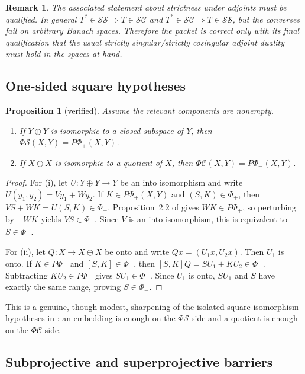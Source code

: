 \documentclass[11pt]{article}
\newtheorem{proposition}[theorem]{Proposition}
\newtheorem{remark}[theorem]{Remark}
\theoremstyle{definition}
\newcommand{\SSing}{\mathcal{SS}}
\newcommand{\SCos}{\mathcal{SC}}
\newcommand{\PhiS}{\Phi\mathcal S}
\newcommand{\PhiC}{\Phi\mathcal C}
\newcommand{\PhiP}{\Phi_+}
\newcommand{\PhiM}{\Phi_-}
\newcommand{\PPhiP}{P\Phi_+}
\newcommand{\PPhiM}{P\Phi_-}
\begin{document}
\begin{remark}
The associated statement about strictness under adjoints must be qualified.  In general
\(T^*\in\SSing\Rightarrow T\in\SCos\) and
\(T^*\in\SCos\Rightarrow T\in\SSing\), but the converses fail on arbitrary Banach
spaces.  Therefore the packet is correct only with its final qualification that the usual
strictly singular/strictly cosingular adjoint duality must hold in the spaces at hand.
\end{remark}

\subsection{One-sided square hypotheses}

\begin{proposition}[verified]
Assume the relevant components are nonempty.
\begin{enumerate}[label=\rm(\roman*)]
\item If \(Y\oplus Y\) is isomorphic to a closed subspace of \(Y\), then
\(\PhiS(X,Y)=\PPhiP(X,Y)\).
\item If \(X\oplus X\) is isomorphic to a quotient of \(X\), then
\(\PhiC(X,Y)=\PPhiM(X,Y)\).
\end{enumerate}
\end{proposition}

\begin{proof}
For (i), let \(U\colon Y\oplus Y\to Y\) be an into isomorphism and write
\(U(y_1,y_2)=Vy_1+Wy_2\).  If \(K\in\PPhiP(X,Y)\) and \((S,K)\in\PhiP\), then
\(VS+WK=U(S,K)\in\PhiP\).  Proposition~2.2 of \cite{GSB2023} gives
\(WK\in\PPhiP\), so perturbing by \(-WK\) yields \(VS\in\PhiP\).  Since \(V\) is an
into isomorphism, this is equivalent to \(S\in\PhiP\).

For (ii), let \(Q\colon X\to X\oplus X\) be onto and write
\(Qx=(U_1x,U_2x)\).  Then \(U_1\) is onto.  If \(K\in\PPhiM\) and
\([S,K]\in\PhiM\), then
\([S,K]Q=SU_1+KU_2\in\PhiM\).  Subtracting \(KU_2\in\PPhiM\) gives
\(SU_1\in\PhiM\).  Since \(U_1\) is onto, \(SU_1\) and \(S\) have exactly the same
range, proving \(S\in\PhiM\).
\end{proof}

This is a genuine, though modest, sharpening of the isolated square-isomorphism
hypotheses in \cite{GSB2023}: an embedding is enough on the \(\PhiS\) side and a quotient
is enough on the \(\PhiC\) side.

\subsection{Subprojective and superprojective barriers}
\end{document}
